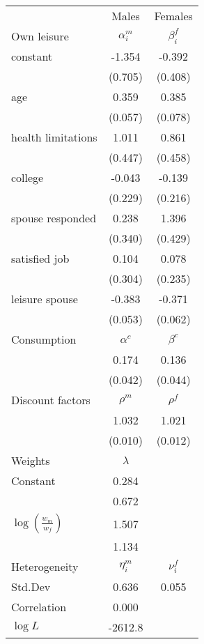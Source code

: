 \begin{tabular}{lcc} 
\hline\hline 
 & Males & Females \\ 
Own leisure & $\alpha_{i}^{m}$ & $\beta_{i}^{f}$ \\ 
constant & -1.354 & -0.392 \\ 
 & (0.705) & (0.408) \\ 
age & 0.359 & 0.385 \\ 
 & (0.057) & (0.078) \\ 
health limitations & 1.011 & 0.861 \\ 
 & (0.447) & (0.458) \\ 
college & -0.043 & -0.139 \\ 
 & (0.229) & (0.216) \\ 
spouse responded & 0.238 & 1.396 \\ 
 & (0.340) & (0.429) \\ 
satisfied job & 0.104 & 0.078 \\ 
 & (0.304) & (0.235) \\ 
leisure spouse & -0.383 & -0.371 \\ 
 & (0.053) & (0.062) \\ 
Consumption & $\alpha^{c}$ & $\beta^{c}$ \\ 
 & 0.174 & 0.136 \\ 
 & (0.042) & (0.044) \\ 
Discount factors & $\rho^m$ & $\rho^f$ \\ 
 & 1.032 & 1.021 \\ 
 & (0.010) & (0.012) \\ 
Weights & $\lambda$ &  \\ 
Constant & 0.284 &  \\ 
 & 0.672 &  \\ 
$\log(\frac{w_m}{w_f})$ & 1.507 &  \\ 
 & 1.134 &  \\ 
Heterogeneity & $\eta_i^m$ & $\nu_i^f$ \\ 
Std.Dev & 0.636 & 0.055 \\ 
Correlation & 0.000 &  \\ 
\hline 
$\log L$ & -2612.8 & \\ 
\hline \hline 
\end{tabular} 
